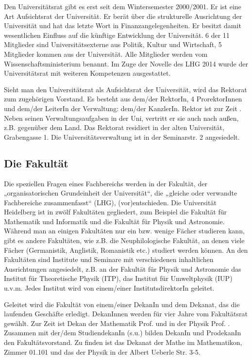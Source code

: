 Den Universitätsrat gibt es erst seit dem Wintersemester 2000/2001. Er ist eine
Art Aufsichtsrat der Universität. Er berät über die strukturelle Ausrichtung
der Universität und hat das letzte Wort in Finanzangelegenheiten. Er besitzt
damit wesentlichen Einfluss auf die künftige Entwicklung der Universität. 6 der
11 Mitglieder sind Universitätsexterne aus Politik, Kultur und Wirtschaft, 5
Mitglieder kommen aus der Universität. Alle Mitglieder werden vom
Wissenschaftsministerium benannt. Im Zuge der Novelle des LHG 2014 wurde der
Universitätsrat mit weiteren Kompetenzen ausgestattet.

Sieht man den Universitätsrat als Aufsichtsrat der Universität, wird das
Rektorat zum zugehörigen Vorstand. Es besteht aus dem/der RektorIn, 4
ProrektorInnen und dem/der LeiterIn der Verwaltung: dem/der KanzlerIn.  Rektor
ist zur Zeit \rektor . Neben seinen Verwaltungsaufgaben in der Uni, vertritt er
sie auch nach außen, z.B. gegenüber dem Land. Das Rektorat residiert in der
alten Universität, Grabengasse 1. Die Universitätsverwaltung ist in der
Seminarstr. 2 angesiedelt.

\subsection{Die Fakultät}

Die speziellen Fragen eines Fachbereichs werden in der Fakultät, der
„organisatorischen Grundeinheit der Universität“, die „gleiche oder verwandte
Fachbereiche zusammenfasst“ (LHG), (vor)entschieden. Die Universität Heidelberg
ist in zwölf Fakultäten gegliedert, zum Beispiel die Fakultät für Mathematik
und Informatik und die Fakultät für Physik und Astronomie. Während man an
einigen Fakultäten nur ein bzw. wenige Fächer studieren kann, gibt es andere
Fakultäten, wie z.B. die Neuphilologische Fakultät, an denen viele Fächer
(Germanistik, Anglistik, Romanistik etc.) studiert werden können. An den
Fakultäten sind Institute und Seminare mit verschiedenen inhaltlichen
Ausrichtungen angesiedelt, z.B. an der Fakultät für Physik und Astronomie das
Institut für Theoretische Physik (ITP), das Institut für Umweltphysik (IUP)
u.v.m. Jedes Institut wird von einem/einer InstitutsdirektorIn geleitet.

Geleitet wird die Fakultät von einem/einer DekanIn und dem Dekanat, das die
laufenden Geschäfte erledigt. DekanInnen werden für vier Jahre vom Fakultätsrat
gewählt. Zur Zeit ist Dekan der Mathematik Prof. \dekanmathe{} und in der
Physik Prof. \dekanphysik. Zusammen mit der/dem StudiendekanIn (s.u.) bilden
DekanIn und ProdekanIn den Fakultätsvorstand. Zu finden ist das Dekanat der
Mathe im \Gls{Mathematikon}, Zimmer 01.101 und das der Physik in der Albert
Ueberle Str. 3-5.

